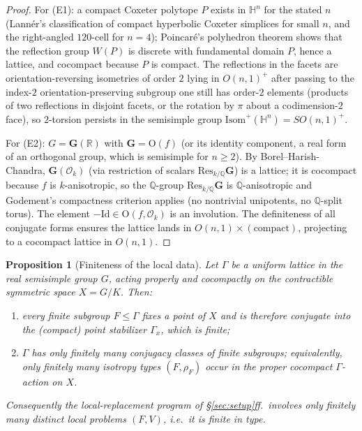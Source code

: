 \documentclass[12pt]{article}
\newtheorem{proposition}[theorem]{Proposition}
\theoremstyle{definition}
\begin{document}
\begin{proof}
For (E1): a compact Coxeter polytope $P$ exists in $\mathbb{H}^n$ for the stated
$n$ (Lannér's classification of compact hyperbolic Coxeter simplices for small
$n$, and the right-angled $120$-cell for $n=4$); Poincaré's polyhedron theorem
shows that the reflection group $W(P)$ is discrete with fundamental domain $P$,
hence a lattice, and cocompact because $P$ is compact. The reflections in the
facets are orientation-reversing isometries of order $2$ lying in
$O(n,1)^+$ after passing to the index-$2$ orientation-preserving subgroup one
still has order-$2$ elements (products of two reflections in disjoint facets, or
the rotation by $\pi$ about a codimension-$2$ face), so $2$-torsion persists in
the semisimple group $\mathrm{Isom}^+(\mathbb{H}^n)=SO(n,1)^+$.

For (E2): $G=\mathbf{G}(\mathbb{R})$ with $\mathbf{G}=\mathrm{O}(f)$ (or its
identity component, a real form of an orthogonal group, which is semisimple for
$n\ge2$). By Borel--Harish-Chandra, $\mathbf{G}(\mathcal{O}_k)$ (via restriction
of scalars $\mathrm{Res}_{k/\mathbb{Q}}\mathbf{G}$) is a lattice; it is
cocompact because $f$ is $k$-anisotropic, so the $\mathbb{Q}$-group
$\mathrm{Res}_{k/\mathbb{Q}}\mathbf{G}$ is $\mathbb{Q}$-anisotropic and Godement's
compactness criterion applies (no nontrivial unipotents, no $\mathbb{Q}$-split
torus). The element $-\mathrm{Id}\in\mathrm{O}(f,\mathcal{O}_k)$ is an involution.
The definiteness of all conjugate forms ensures the lattice lands in
$O(n,1)\times(\text{compact})$, projecting to a cocompact lattice in $O(n,1)$.
\end{proof}

\begin{proposition}[Finiteness of the local data]\label{prop:finite}
Let $\Gamma$ be a uniform lattice in the real semisimple group $G$, acting
properly and cocompactly on the contractible symmetric space $X=G/K$. Then:
\begin{enumerate}
\item[\rm(F1)] every finite subgroup $F\le\Gamma$ fixes a point of $X$ and is
therefore conjugate into the (compact) point stabilizer $\Gamma_x$, which is
finite;
\item[\rm(F2)] $\Gamma$ has only finitely many conjugacy classes of finite
subgroups; equivalently, only finitely many isotropy types $(F,\rho_F)$ occur in
the proper cocompact $\Gamma$-action on $X$.
\end{enumerate}
Consequently the local-replacement program of \S\ref{sec:setup}ff.\ involves only
finitely many distinct local problems $(F,V)$, i.e.\ it is \emph{finite in type}.
\end{proposition}
\end{document}
